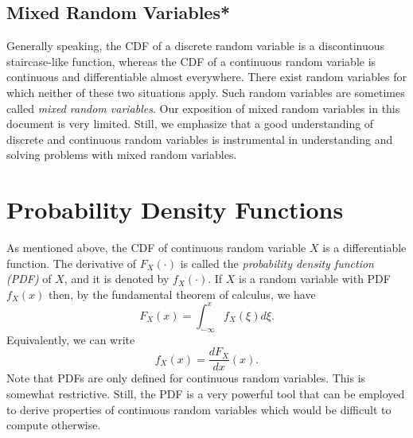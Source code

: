\subsection{Mixed Random Variables*}

Generally speaking, the CDF of a discrete random variable is a discontinuous staircase-like function, whereas the CDF of a continuous random variable is continuous and differentiable almost everywhere.
There exist random variables for which neither of these two situations apply.
Such random variables are sometimes called \emph{mixed random variables}. 
Our exposition of mixed random variables in this document is very limited.
Still, we emphasize that a good understanding of discrete and continuous random variables is instrumental in understanding and solving problems with mixed random variables.


\section{Probability Density Functions}

As mentioned above, the CDF of continuous random variable $X$ is a differentiable function.
The derivative of $F_X (\cdot)$ is called the \emph{probability density function (PDF)} of $X$, and it is denoted by $f_X(\cdot)$. 
If $X$ is a random variable with PDF $f_X (x)$ then, by the fundamental theorem of calculus, we have
\begin{equation*}
F_X (x) = \int_{- \infty}^x f_X (\xi) d\xi .
\end{equation*}
Equivalently, we can write
\begin{equation*}
f_X (x) = \frac{d F_X}{dx} (x) .
\end{equation*}
Note that PDFs are only defined for continuous random variables.
This is somewhat restrictive.
Still, the PDF is a very powerful tool that can be employed to derive properties of continuous random variables which would be difficult to compute otherwise.

